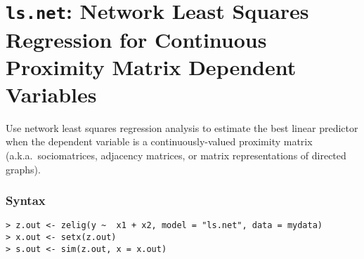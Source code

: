\section{{\tt ls.net}: Network Least Squares Regression for Continuous Proximity Matrix Dependent Variables}
\label{ls.net}

Use network least squares regression analysis to estimate the
best linear predictor when the dependent variable is a
continuously-valued proximity matrix (a.k.a.\ sociomatrices, adjacency
matrices, or matrix representations of directed graphs). 

\subsubsection{Syntax}
\begin{verbatim}
> z.out <- zelig(y ~  x1 + x2, model = "ls.net", data = mydata)
> x.out <- setx(z.out)
> s.out <- sim(z.out, x = x.out)
\end{verbatim}


